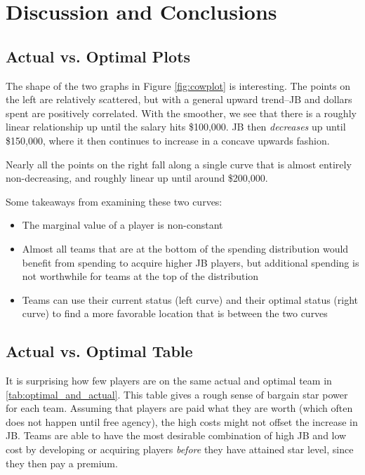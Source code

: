 \documentclass{article}
\begin{document}
%

\section{Discussion and Conclusions}

\subsection{Actual vs. Optimal Plots}

The shape of the two graphs in Figure \ref{fig:cowplot} is interesting. The points on the left are relatively scattered, but with a general upward trend--JB and dollars spent are positively correlated. With the smoother, we see that there is a roughly linear relationship up until the salary hits \$100,000. JB then \emph{decreases} up until \$150,000, where it then continues to increase in a concave upwards fashion.

Nearly all the points on the right fall along a single curve that is almost entirely non-decreasing, and roughly linear up until around \$200,000. 

Some takeaways from examining these two curves:
\begin{singlespace}
\begin{itemize}
	\item{The marginal value of a player is non-constant}
	\item{Almost all teams that are at the bottom of the spending distribution would benefit from spending to acquire higher JB players, but additional spending is not worthwhile for teams at the top of the distribution}
	\item{Teams can use their current status (left curve) and their optimal status (right curve) to find a more favorable location that is between the two curves}
\end{itemize}
\end{singlespace}

\subsection{Actual vs. Optimal Table}

It is surprising how few players are on the same actual and optimal team in \ref{tab:optimal_and_actual}. This table gives a rough sense of bargain star power for each team. Assuming that players are paid what they are worth (which often does not happen until free agency), the high costs might not offset the increase in JB. Teams are able to have the most desirable combination of high JB and low cost by developing or acquiring players \emph{before} they have attained star level, since they then pay a premium. 
\end{document}
